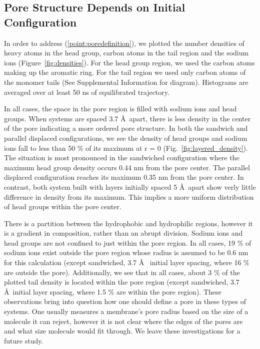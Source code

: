 \documentclass{article}
\begin{document}
  \subsection{Pore Structure Depends on Initial Configuration}

  In order to address (\ref{point:poredefinition}), we plotted the number
  densities of heavy atoms in the head group, carbon atoms in the tail region
  and the sodium ions (Figure~\ref{fig:densities}). For the head group region,
  we used the carbon atoms making up the aromatic ring. For the tail region we
  used only carbon atoms of the monomer tails (See Supplemental Information for
  diagram). Histograms are averaged over at least 50 ns of equilibrated trajectory.

  In all cases, the space in the pore region is filled with sodium ions and
  head groups. When systems are spaced 3.7 \AA~apart, there is less density in
  the center of the pore indicating a more ordered pore structure. In both the
  sandwich and parallel displaced configurations, we see the density of head
  groups and sodium ions fall to less than 50 \% of its maximum at r = 0
  (Fig.~\ref{fig:layered_density}).  The situation is most pronounced in the
  sandwiched configuration where the maximum head group density occurs 0.44 nm from the pore
  center. The parallel displaced configuration reaches its maximum 0.35 nm from
  the pore center. In contrast, both system built with layers initially spaced
  5 \AA~apart show verly little difference in density from its maximum. This 
  implies a more uniform distribution of head groups within the pore center. 

  There is a partition between the hydrophobic and hydrophilic regions, however
  it is a gradient in composition, rather than an abrupt division. Sodium ions
  and head groups are not confined to just within the pore region. In all cases,
  19 \% of sodium ions exist outside the pore region whose radius is assumed to
  be 0.6 nm for this calculation (except sandwiched, 3.7 \AA~ initial layer
  spacing, where 16 \% are outside the pore). Additionally, we see that in all
  cases, about 3 \% of the plotted tail density is located within the pore region
  (except sandwiched, 3.7 \AA~initial layer spacing, where 1.5 \% are within the
  pore region). These observations bring into question how one should define a
  pore in these types of systems. One usually measures a membrane's pore radius
  based on the size of a molecule it can reject, however it is not clear where
  the edges of the pores are and what size molecule would fit through. We leave
  these investigations for a future study.
\end{document}
